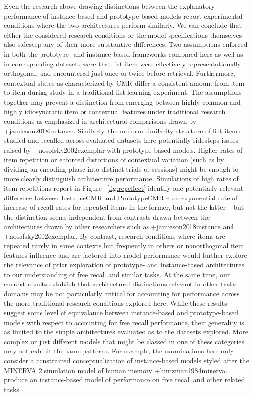 {}Even the research above drawing distinctions between the explanatory performance of instance-based and prototype-based models report experimental conditions where the two architectures perform similarly. We can conclude that either the considered research conditions or the model specifications themselves also sidestep any of their more substantive differences. Two assumptions enforced in both the prototype- and instance-based frameworks compared here as well as in corresponding datasets were that list item were effectively representationally orthogonal, and encountered just once or twice before retrieval. Furthermore, contextual states as characterized by CMR differ a consistent amount from item to item during study in a traditional list learning experiment. The assumptions together may prevent a distinction from emerging between highly common and highly idiosyncratic item or contextual features under traditional research conditions as emphasized in architectural comparisons drawn by +{}{}{jamieson2018instance}. Similarly, the uniform similarity structure of list items studied and recalled across evaluated datasets here potentially sidesteps issues raised by +{}{}{nosofsky2002exemplar} with prototype-based models.\markdownRendererInterblockSeparator
{}Higher rates of item repetition or enforced distortions of contextual variation (such as by dividing an encoding phase into distinct trials or sessions) might be enough to more clearly distinguish architecture performance. Simulations of high rates of item repetitions report in Figure ~\ref{fig:repeffect} identify one potentially relevant difference between InstanceCMR and PrototypeCMR -- an exponential rate of increase of recall rates for repeated items in the former, but not the latter -- but the distinction seems independent from contrasts drawn between the architectures drawn by other researchers such as +{}{}{jamieson2018instance} and +{}{}{nosofsky2002exemplar}. By contrast, research conditions where items are repeated rarely in some contexts but frequently in others or nonorthogonal item features influence and are factored into model performance would further explore the relevance of prior exploration of prototype- and instance-based architectures to our understanding of free recall and similar tasks. At the same time, our current results establish that architectural distinctions relevant in other tasks domains may be not particularly critical for accounting for performance across the more traditional research conditions explored here.\markdownRendererInterblockSeparator
{}While these results suggest some level of equivalance between instance-based and prototype-based models with respect to accounting for free recall performance, their generality is as limited to the simple architectures evaluated as to the datasets explored. More complex or just different models that might be classed in one of these categories may not exhibit the same patterns. For example, the examinations here only consider a constrained conceptualization of instance-based models styled after the MINERVA 2 simulation model of human memory +{}{}{hintzman1984minerva}. produce an instance-based model of performance on free recall and other related tasks\relax